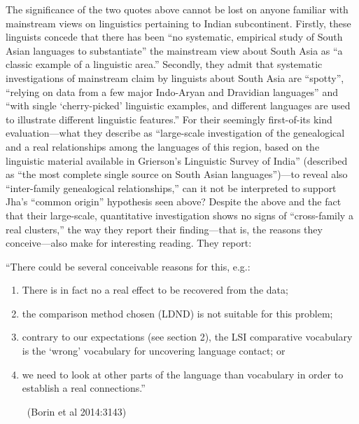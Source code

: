 The significance of the two quotes above cannot be lost on anyone familiar with mainstream views on linguistics pertaining to Indian subcontinent. Firstly, these linguists concede that there has been “no systematic, empirical study of South Asian languages to substantiate” the mainstream view about South Asia as “a classic example of a linguistic area.” Secondly, they admit that systematic investigations of mainstream claim by linguists about South Asia are “spotty”, “relying on data from a few major Indo-Aryan and Dravidian languages” and “with single ‘cherry-picked’ linguistic examples, and different languages are used to illustrate different linguistic features.” For their seemingly first-of-its kind evaluation—what they describe as “large-scale investigation of the genealogical and a real relationships among the languages of this region, based on the linguistic material available in Grierson’s Linguistic Survey of India” (described as “the most complete single source on South Asian languages”)—to reveal also “inter-family genealogical relationships,” can it not be interpreted to support Jha’s “common origin” hypothesis seen above? Despite the above and the fact that their large-scale, quantitative investigation shows no signs of “cross-family a real clusters,” the way they report their finding—that is, the reasons they conceive—also make for interesting reading. They report:

\begin{myquote}
“There could be several conceivable reasons for this, e.g.:
\end{myquote}

\begin{enumerate}
\item There is in fact no a real effect to be recovered from the data;

 \item the comparison method chosen (LDND) is not suitable for this problem;

 \item contrary to our expectations (see section 2), the LSI comparative vocabulary is the ‘wrong’ vocabulary for uncovering language contact; or
 
 \item we need to look at other parts of the language than vocabulary in order to establish a real connections.”

~\hfill (Borin et al 2014:3143)

\end{enumerate}

